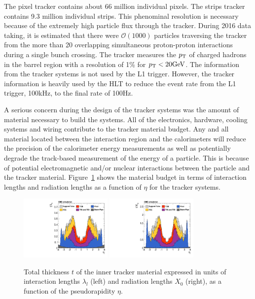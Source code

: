 The pixel tracker contains about 66 million individual pixels. The strips tracker
contains 9.3 million individual strips. This phenominal resolution is necessary
because of the extremely high particle flux through the tracker. During 2016 data
taking, it is estimated that there were $\mathcal{O}( 1000 )$ particles 
traversing the tracker from the more than 20 overlapping simultaneous proton-proton 
interactions during a single bunch crossing. The tracker measures the $p_\mathrm{T}$ of 
charged hadrons in the barrel region with a resolution of 1\% for $p_\mathrm{T} < 20\mathrm{GeV}$.
The information from the tracker systems is
not used by the L1 trigger. However, the tracker information is heavily used by the HLT to
reduce the event rate from the L1 trigger, 100kHz, to the final rate of 100Hz.

A serious concern during the design of the tracker systems was the amount of
material necessary to build the systems. All of the electronics, hardware, 
cooling systems and wiring contribute to the tracker material budget. Any and all material
located between the interaction region and the calorimeters will reduce the precision 
of the calorimeter energy measurements as well as potentially degrade the track-based
measurement of the energy of a particle. This is because of potential electromagnetic
and/or nuclear interactions between the particle and the tracker material. Figure~\ref{fig:cms_tracker_thickness}
shows the material budget in terms of interaction lengths and radiation lengths as a function
of $\eta$ for the tracker systems.

\begin{figure}[htbp]
\centering
     \includegraphics[width=0.4\textwidth]{cms_and_lhc/plots/cms_tracker_thickness_radiationL.pdf}
     \includegraphics[width=0.4\textwidth]{cms_and_lhc/plots/cms_tracker_thickness_interactionL.pdf}
     \caption{
Total thickness $t$ of the inner tracker material expressed in units of interaction lengths 
$\lambda_{l}$ (left) and radiation lengths $X_{0}$ (right), as a function of the pseudorapidity $\eta$.
     }
     \label{fig:cms_tracker_thickness}
\end{figure}



